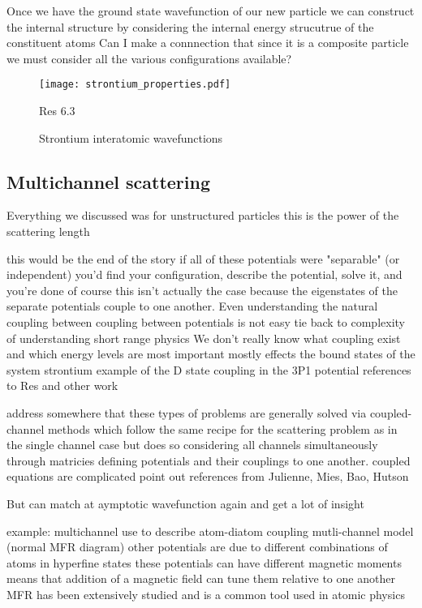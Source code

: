 Once we have the ground state wavefunction of our new particle we can construct the internal structure by considering the internal energy strucutrue of the constituent atoms
	Can I make a connnection that since it is a composite particle we must consider all the various configurations available?
	
\begin{figure} \label{fig:ch3_sr_scat_wf}
	\centerline{
	\texttt{[image: strontium\_properties.pdf]}}
	\caption{Strontium interatomic wavefunctions}{Res 6.3}
\end{figure} 

\subsection{Multichannel scattering} \label{ssec:multi_chan}
Everything we discussed was for unstructured particles
	this is the power of the scattering length
	
this would be the end of the story if all of these potentials were "separable" (or independent)
	you'd find your configuration, describe the potential, solve it, and you're done
of course this isn't actually the case because the eigenstates of the separate potentials couple to one another.
Even understanding the natural coupling between coupling between potentials is not easy
	tie back to complexity of understanding short range physics
		We don't really know what coupling exist and which energy levels are most important
	mostly effects the bound states of the system
	strontium example of the D state coupling in the 3P1 potential
		references to Res and other work

address somewhere that these types of problems are generally solved via coupled-channel methods which follow the same recipe for the scattering problem as in the single channel case but does so considering all channels simultaneously through matricies defining potentials and their couplings to one another.
coupled equations are complicated
	point out references from Julienne, Mies, Bao, Hutson
	
But can match at aymptotic wavefunction again and get a lot of insight
	
example: multichannel use to describe atom-diatom coupling
	mutli-channel model (normal MFR diagram)
		other potentials are due to different combinations of atoms in hyperfine states
	these potentials can have different magnetic moments
		means that addition of a magnetic field can tune them relative to one another
MFR has been extensively studied and is a common tool used in atomic physics
	
